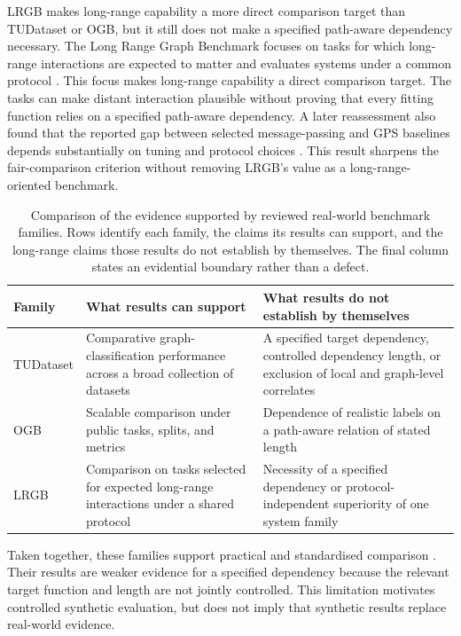 LRGB makes long-range capability a more direct comparison target than TUDataset or OGB, but it still does not make a specified path-aware dependency necessary.
The Long Range Graph Benchmark focuses on tasks for which long-range interactions are expected to matter and evaluates systems under a common protocol \cite{dwivedi2022long}.
This focus makes long-range capability a direct comparison target.
The tasks can make distant interaction plausible without proving that every fitting function relies on a specified path-aware dependency.
A later reassessment also found that the reported gap between selected message-passing and GPS baselines depends substantially on tuning and protocol choices \cite{tonshoff2023gap}.
This result sharpens the fair-comparison criterion without removing LRGB's value as a long-range-oriented benchmark.

\begin{table}[t]
\centering
\footnotesize
\setlength{\tabcolsep}{3pt}
\begin{tabular}{L{0.16\textwidth}L{0.31\textwidth}L{0.41\textwidth}}
\hline
\textbf{Family} & \textbf{What results can support} & \textbf{What results do not establish by themselves} \\
\hline
TUDataset & Comparative graph-classification performance across a broad collection of datasets & A specified target dependency, controlled dependency length, or exclusion of local and graph-level correlates \cite{morris2020tudataset} \\
OGB & Scalable comparison under public tasks, splits, and metrics & Dependence of realistic labels on a path-aware relation of stated length \cite{hu2020ogb,dwivedi2023benchmarking} \\
LRGB & Comparison on tasks selected for expected long-range interactions under a shared protocol & Necessity of a specified dependency or protocol-independent superiority of one system family \cite{dwivedi2022long,tonshoff2023gap} \\
\hline
\end{tabular}
\caption{Comparison of the evidence supported by reviewed real-world benchmark families.
Rows identify each family, the claims its results can support, and the long-range claims those results do not establish by themselves.
The final column states an evidential boundary rather than a defect.}
\label{tab:sota-real-benchmarks}
\end{table}

Taken together, these families support practical and standardised comparison \cite{hu2020ogb,morris2020tudataset,dwivedi2022long,dwivedi2023benchmarking}.
Their results are weaker evidence for a specified dependency because the relevant target function and length are not jointly controlled.
This limitation motivates controlled synthetic evaluation, but does not imply that synthetic results replace real-world evidence.

